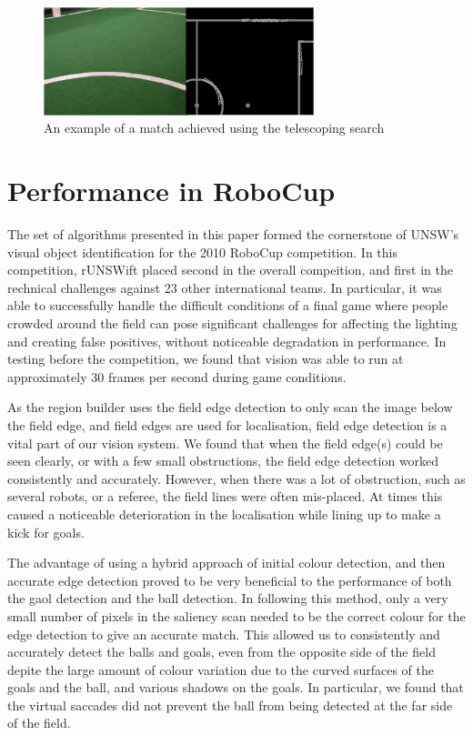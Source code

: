 \documentclass[runningheads,a4paper]{llncs}
\begin{document}
\begin{figure} [t]
\centering
\includegraphics[width=0.7\textwidth]{figures/fieldLineMatching.png}
\caption{An example of a match achieved using the telescoping search} \label{fig:fieldLineMatching}
\end{figure}

\section{Performance in RoboCup}

The set of algorithms presented in this paper formed the cornerstone of UNSW's visual object identification for the 2010 RoboCup competition. In this competition, rUNSWift placed second in the overall compeition, and first in the rechnical challenges against 23 other international teams. In particular, it was able to successfully handle the difficult conditions of a final game where people crowded around the field can pose significant challenges for affecting the lighting and creating false positives, without noticeable degradation in performance. In testing before the competition, we found that vision was able to run at approximately 30 frames per second during game conditions.

As the region builder uses the field edge detection to only scan the image below the field edge, and field edges are used for localisation, field edge detection is a vital part of our vision system. We found that when the field edge(s) could be seen clearly, or with a few small obstructions, the field edge detection worked consistently and accurately. However, when there was a lot of obstruction, such as several robots, or a referee, the field lines were often mis-placed. At times this caused a noticeable deterioration in the localisation while lining up to make a kick for goals.

The advantage of using a hybrid approach of initial colour detection, and then accurate edge detection proved to be very beneficial to the performance of both the gaol detection and the ball detection. In following this method, only a very small number of pixels in the saliency scan needed to be the correct colour for the edge detection to give an accurate match. This allowed us to consistently and accurately detect the balls and goals, even from the opposite side of the field depite the large amount of colour variation due to the curved surfaces of the goals and the ball, and various shadows on the goals. In particular, we found that the virtual saccades did not prevent the ball from being detected at the far side of the field.
\end{document}
